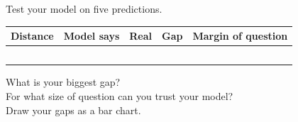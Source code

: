 \thispagestyle{fancy}
Test your model on five predictions.\par\medskip
\renewcommand{\arraystretch}{2.8}
\begin{tabularx}{\linewidth}{|>{\sffamily\small\bfseries}p{2.4cm}|X|X|X|X|}
\hline
Distance & Model says & Real & Gap & Margin of question \\ \hline
 & & & & \\ \hline
 & & & & \\ \hline
 & & & & \\ \hline
 & & & & \\ \hline
 & & & & \\ \hline
\end{tabularx}

\vspace{8pt}
What is your biggest gap? \wline[7cm]\\[10pt]
For what size of question can you trust your model? \wline[5cm]\\[10pt]
Draw your gaps as a bar chart.\par\medskip
{}
\clearpage
